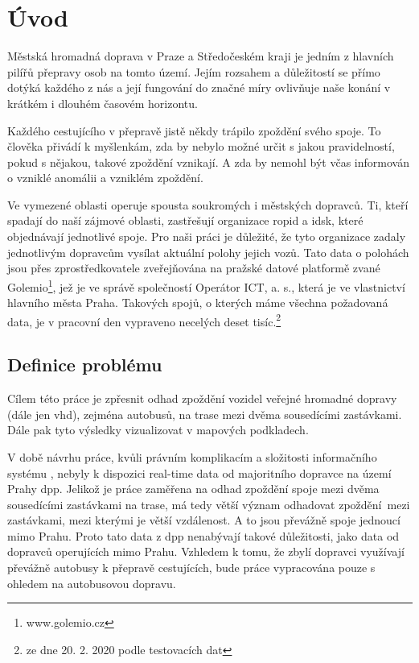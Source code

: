 \chapter*{Úvod}

Městská hromadná doprava v Praze a Středočeském kraji je jedním z hlavních pilířů přepravy osob na tomto území. Jejím rozsahem a důležitostí se přímo dotýká každého z nás a její fungování do značné míry ovlivňuje naše konání v krátkém i dlouhém časovém horizontu.

\bigbreak

Každého cestujícího v přepravě jistě někdy trápilo zpoždění svého spoje. To člověka přivádí k myšlenkám, zda by nebylo možné určit s jakou pravidelností, pokud s nějakou, takové zpoždění vznikají. A zda by nemohl být včas informován o vzniklé anomálii a vzniklém zpoždění.

\bigbreak

Ve vymezené oblasti operuje spousta soukromých i městských dopravců. Ti, kteří spadají do naší zájmové oblasti, zastřešují organizace \gls{ropid} a \gls{idsk}, které objednávají jednotlivé spoje. Pro naši práci je důležité, že tyto organizace zadaly jednotlivým dopravcům vysílat aktuální polohy jejich vozů. Tato data o polohách jsou přes zprostředkovatele zveřejňována na pražské datové platformě zvané Golemio\footnote{www.golemio.cz}, jež je ve správě společností Operátor ICT, a. s., která je ve vlastnictví hlavního města Praha. Takových spojů, o kterých máme všechna požadovaná data, je v pracovní den vypraveno necelých deset tisíc.\footnote{ze dne 20. 2. 2020 podle testovacích dat}

\section*{Definice problému}

Cílem této práce je zpřesnit odhad zpoždění vozidel veřejné hromadné dopravy (dále jen \gls{vhd}), zejména autobusů, na trase mezi dvěma sousedícími zastávkami. Dále pak tyto výsledky vizualizovat v mapových podkladech.


\bigbreak

V době návrhu práce, kvůli právním komplikacím a složitosti informačního systému \citet{Gurycova19}, nebyly k dispozici real-time data od majoritního dopravce na území Prahy \gls{dpp}. Jelikož je práce zaměřena na odhad zpoždění spoje mezi dvěma sousedícími zastávkami na trase, má tedy větší význam odhadovat zpoždění mezi zastávkami, mezi kterými je větší vzdálenost. A to jsou převážně spoje jednoucí mimo Prahu. Proto tato data z \gls{dpp} nenabývají takové důležitosti, jako data od dopravců operujících mimo Prahu. Vzhledem k tomu, že zbylí dopravci využívají převážně autobusy k přepravě cestujících, bude práce vypracována pouze s ohledem na autobusovou dopravu.


